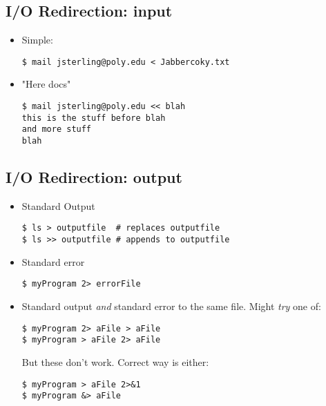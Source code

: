 \documentclass[]{article}
\begin{document}
\subsection{\texorpdfstring{\textbf{I/O Redirection:
input}}{I/O Redirection: input}}\label{header-n649}

\begin{itemize}
\item
  Simple:

\begin{verbatim}
$ mail jsterling@poly.edu < Jabbercoky.txt
\end{verbatim}
\end{itemize}

\begin{itemize}
\item
  "Here docs"

\begin{verbatim}
$ mail jsterling@poly.edu << blah
this is the stuff before blah
and more stuff
blah
\end{verbatim}
\end{itemize}

\subsection{\texorpdfstring{\textbf{I/O Redirection:
output}}{I/O Redirection: output}}\label{header-n661}

\begin{itemize}
\item
  Standard Output

\begin{verbatim}
$ ls > outputfile  # replaces outputfile
$ ls >> outputfile # appends to outputfile
\end{verbatim}
\item
  Standard error

\begin{verbatim}
$ myProgram 2> errorFile
\end{verbatim}
\item
  Standard output \emph{and} standard error to the same file. Might
  \emph{try} one of:

\begin{verbatim}
$ myProgram 2> aFile > aFile
$ myProgram > aFile 2> aFile
\end{verbatim}

  But these don't work. Correct way is either:

\begin{verbatim}
$ myProgram > aFile 2>&1
$ myProgram &> aFile
\end{verbatim}
\end{itemize}
\end{document}
